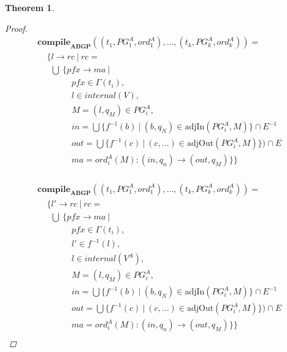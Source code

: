 \documentclass[twocolumn]{sig-alternate-10pt}
\newtheorem{thm}{Theorem}[section]
\begin{document}
\begin{thm}
\begin{proof}
  \[ \begin{array}{l}
     \textbf{compile}_\textbf{ABGP}( (t_1,PG^A_1,ord^A_1), \dots, (t_k,PG^A_k,ord^A_k) ) = \\
     ~~~~~ \{ l \rightarrow rc ~\vert~ rc = \\
     ~~~~~~~ \bigcup~ \{ pfx \rightarrow ma ~\vert~ \\
     ~~~~~~~~~~~~~~~~~~ pfx \in \Gamma(t_i), \\
     ~~~~~~~~~~~~~~~~~~ l \in internal(V), \\
     ~~~~~~~~~~~~~~~~~~ M = (l,q_M) \in PG^A_i, \\
     ~~~~~~~~~~~~~~~~~~ in = \bigcup \{ f^{-1}(b) ~\vert~ (b,q_N) \in \text{adjIn}(PG^A_i,M) \} \cap E^{-1} \\
     ~~~~~~~~~~~~~~~~~~ out = \bigcup \{ f^{-1}(c) ~\vert~ (c,\dots) \in \text{adjOut}(PG^A_i,M) \}) \cap E \\ 
     ~~~~~~~~~~~~~~~~~~ ma = ord^A_i(M) : (in,q_n) \rightarrow (out,q_M) \} \} \\
  \end{array} \]%

  \[ \begin{array}{l}
     \textbf{compile}_\textbf{ABGP}( (t_1,PG^A_1,ord^A_1), \dots, (t_k,PG^A_k,ord^A_k) ) = \\
     ~~~~~ \{ l' \rightarrow rc ~\vert~ rc = \\
     ~~~~~~~ \bigcup~ \{ pfx \rightarrow ma ~\vert~ \\
     ~~~~~~~~~~~~~~~~~~ pfx \in \Gamma(t_i), \\
     ~~~~~~~~~~~~~~~~~~ l' \in f^{-1}(l), \\
     ~~~~~~~~~~~~~~~~~~ l \in internal(V^A), \\
     ~~~~~~~~~~~~~~~~~~ M = (l,q_M) \in PG^A_i, \\
     ~~~~~~~~~~~~~~~~~~ in = \bigcup \{ f^{-1}(b) ~\vert~ (b,q_N) \in \text{adjIn}(PG^A_i,M) \} \cap E^{-1} \\
     ~~~~~~~~~~~~~~~~~~ out = \bigcup \{ f^{-1}(c) ~\vert~ (c,\dots) \in \text{adjOut}(PG^A_i,M) \}) \cap E \\ 
     ~~~~~~~~~~~~~~~~~~ ma = ord^A_i(M) : (in,q_n) \rightarrow (out,q_M) \} \} \\
  \end{array} \]%


\end{proof}
\end{thm}
\end{document}
